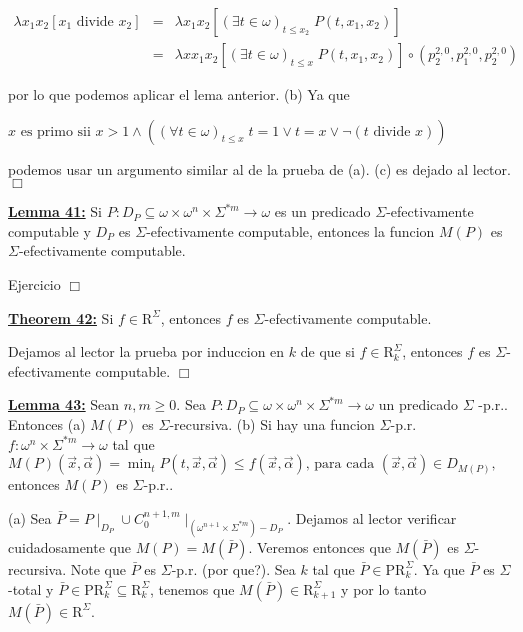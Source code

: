 \(\displaystyle \begin{array}{rcl} \lambda x_{1}x_{2}\left[ x_{1}\text{ divide }x_{2}\right] & =& \lambda x_{1}x_{2}\left[ (\exists t\in \omega )_{t\leq x_{2}}\;P(t,x_{1},x_{2}) \right] \\ & =& \lambda xx_{1}x_{2}\left[ (\exists t\in \omega )_{t\leq x}\;P(t,x_{1},x_{2})\right] \circ \left( p_{2}^{2,0},p_{1}^{2,0},p_{2}^{2,0}\right) \end{array} \)

por lo que podemos aplicar el lema anterior.
(b) Ya que

\(\displaystyle x\text{ es primo sii }x >1\wedge \left( (\forall t\in \omega )_{t\leq x}\;t=1\vee t=x\vee \lnot (t\text{ divide }x)\right) \)

podemos usar un argumento similar al de la prueba de (a).
(c) es dejado al lector. \(\Box\)


\textbf{\underline{Lemma 41:}} Si \(P:D_{P}\subseteq \omega \times \omega ^{n}\times \Sigma ^{\ast m}\rightarrow \omega \) es un predicado \(\Sigma \)-efectivamente computable y \( D_{P}\) es \(\Sigma \)-efectivamente computable, entonces la funcion \(M(P)\) es \( \Sigma \)-efectivamente computable.

\PROOF Ejercicio \(\Box\)

\textbf{\underline{Theorem 42:}} Si \(f\in \mathrm{R} ^{\Sigma }\), entonces \(f\) es \(\Sigma \)-efectivamente computable.

\PROOF Dejamos al lector la prueba por induccion en \(k\) de que si \(f\in \mathrm{R} _{k}^{\Sigma }\), entonces \(f\) es \(\Sigma \)-efectivamente computable. \(\Box\)

\textbf{\underline{Lemma 43:}} Sean \(n,m\geq 0\). Sea \(P:D_{P}\subseteq \omega \times \omega ^{n}\times \Sigma ^{\ast m}\rightarrow \omega \) un predicado \(\Sigma \) -p.r.. Entonces
(a) \(M(P)\) es \(\Sigma \)-recursiva.
(b) Si hay una funcion \(\Sigma \)-p.r. \(f:\omega ^{n}\times \Sigma ^{\ast m}\rightarrow \omega \) tal que
\(\displaystyle M(P)(\vec{x},\vec{\alpha})=\min_{t}P(t,\vec{x},\vec{\alpha})\leq f(\vec{x}, \vec{\alpha})\text{, para cada }(\vec{x},\vec{\alpha})\in D_{M(P)}\text{,} \)
entonces \(M(P)\) es \(\Sigma \)-p.r..

\PROOF (a) Sea \(\bar{P}=P\mid _{D_{P}}\cup C_{0}^{n+1,m}\mid _{(\omega ^{n+1}\times \Sigma ^{\ast m})-D_{P}}\). Dejamos al lector verificar cuidadosamente que \( M(P)=M(\bar{P})\). Veremos entonces que \(M(\bar{P})\) es \(\Sigma \)-recursiva. Note que \(\bar{P}\) es \(\Sigma \)-p.r. (por que?). Sea \(k\) tal que \(\bar{P}\in \mathrm{PR}_{k}^{\Sigma }\). Ya que \(\bar{P}\) es \(\Sigma \)-total y \(\bar{P} \in \mathrm{PR}_{k}^{\Sigma }\subseteq \mathrm{R}_{k}^{\Sigma }\), tenemos que \(M(\bar{P})\in \mathrm{R}_{k+1}^{\Sigma }\) y por lo tanto \(M(\bar{P})\in \mathrm{R}^{\Sigma }\).

